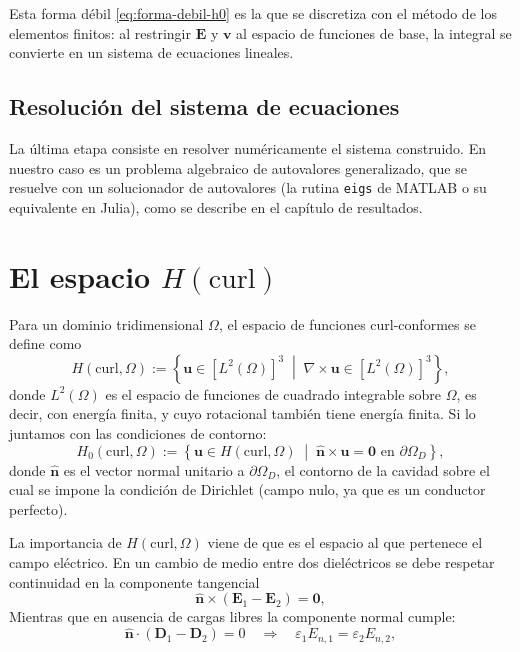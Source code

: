\documentclass[12pt]{report} %
\begin{document}
Esta forma d\'ebil \eqref{eq:forma-debil-h0} es la que se discretiza con el m\'etodo de los elementos finitos: al restringir $\mathbf{E}$ y $\mathbf{v}$ al espacio de funciones de base, la integral se convierte en un sistema de ecuaciones lineales.

\subsection{Resolución del sistema de ecuaciones}\label{subsec:mef-resolucion}
La \'ultima etapa consiste en resolver num\'ericamente el sistema construido. En nuestro caso es un problema algebraico de autovalores generalizado, que se resuelve con un solucionador de autovalores (la rutina \texttt{eigs} de MATLAB o su equivalente en Julia), como se describe en el cap\'itulo de resultados.

\section{El espacio $H(\mathrm{curl})$}\label{sec:hcurl}
Para un dominio tridimensional $\Omega$, el espacio de funciones curl-conformes se define como \cite{amor2023hexahedral}
\begin{equation}\label{eq:hcurl}
	H(\mathrm{curl},\Omega) := \left\{ \mathbf{u} \in [L^2(\Omega)]^3 \;\middle|\; \nabla\times\mathbf{u} \in [L^2(\Omega)]^3 \right\},
\end{equation}
donde $L^2(\Omega)$ es el espacio de funciones de cuadrado integrable sobre $\Omega$, es decir, con energía finita, y cuyo rotacional también tiene energía finita.
Si lo juntamos con las condiciones de contorno:
\begin{equation}\label{eq:hcurl0}
	H_0(\mathrm{curl},\Omega) := \left\{ \mathbf{u} \in H(\mathrm{curl},\Omega) \;\middle|\; \hat{\mathbf{n}}\times\mathbf{u} = \mathbf{0} \text{ en } \partial\Omega_D \right\},
\end{equation}
donde $\hat{\mathbf{n}}$ es el vector normal unitario a $\partial\Omega_D$, el contorno de la cavidad sobre el cual se impone la condición de Dirichlet (campo nulo, ya que es un conductor perfecto).

La importancia de $H(\mathrm{curl},\Omega)$ viene de que es el espacio al que pertenece el campo eléctrico. En un cambio de medio entre dos dieléctricos se debe respetar continuidad en la componente tangencial
\begin{equation}\label{eq:continuidad-tangencial}
	\hat{\mathbf{n}} \times (\mathbf{E}_1 - \mathbf{E}_2) = \mathbf{0},
\end{equation}
Mientras que en ausencia de cargas libres la componente normal cumple:
	\begin{equation}\label{eq:continuidad-dn}
	\hat{\mathbf{n}} \cdot (\mathbf{D}_1 - \mathbf{D}_2) = 0
	\quad\Longrightarrow\quad
	\varepsilon_1 E_{n,1} = \varepsilon_2 E_{n,2},
\end{equation}
\end{document}
